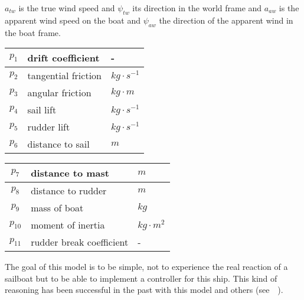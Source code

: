 $a_{tw}$ is the true wind speed and $\psi_{tw}$ its direction in the world frame
and $a_{aw}$ is the apparent wind speed on the boat and $\psi_{aw}$ the direction of the apparent wind in the boat frame.\\
\begin{minipage}{\linewidth}
\centering
{} \label{tab:title2} 
\begin{center}
\begin{tabular}[t]{|c|l|l|}%
\hline
 $p_1$ & drift coefficient & - \\ \hline
 $p_2$ & tangential friction & $kg \cdot s^{-1}$\\ \hline
 $p_3$ & angular friction & $kg \cdot m$ \\ \hline
 $p_4$ & sail lift & $kg \cdot s^{-1}$ \\ \hline
 $p_5$ & rudder lift & $kg \cdot s^{-1}$ \\ \hline
 $p_6$ & distance to sail & $m$ \\ \hline
 \end{tabular}
 \begin{tabular}[t]{|c|l|l|}%
\hline
 $p_7$ & distance to mast & $m$ \\ \hline
 $p_8$ & distance to rudder & $m$ \\ \hline
 $p_9$ & mass of boat & $kg$ \\ \hline
 $p_{10}$ & moment of inertia & $kg \cdot m^2$ \\ \hline
 $p_{11}$ & rudder break coefficient & - \\ \hline
\end{tabular}
\end{center}
\end{minipage}
\bigskip

The goal of this model is to be simple, not to experience the real reaction of a sailboat but
to be able to implement a controller for this ship. This kind of reasoning has been successful in the past 
with this model and others (see~\cite{LeBars2013}~\cite{Melin2016}).

